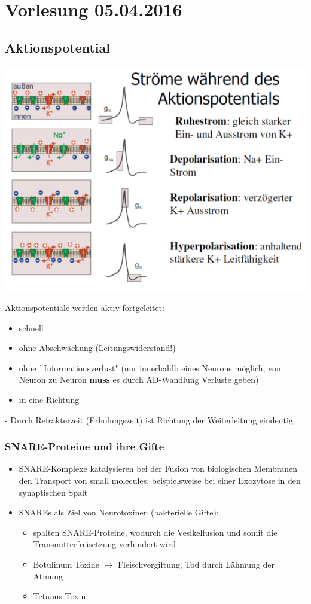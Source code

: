 \section{Vorlesung 05.04.2016}
\subsection{Aktionspotential}
\includegraphics[width=1\textwidth]{lectures/160405/pix/aktionspotential.png}

Aktionspotentiale werden aktiv fortgeleitet:
\begin{itemize}
	\item schnell
	\item ohne Abschwächung (Leitungswiderstand!)
	\item ohne $"$Informationsverlust" (nur innerhahlb eines Neurons möglich, von Neuron zu Neuron \textbf{muss} es durch AD-Wandlung Verluste geben)
	\item in eine Richtung
\end{itemize}

 - Durch Refrakterzeit (Erholungszeit) ist Richtung der Weiterleitung eindeutig

\subsubsection{SNARE-Proteine und ihre Gifte}
\begin{itemize}
	\item SNARE-Komplexe katalysieren bei der Fusion von biologischen Membranen den Transport von small molecules, beispielsweise bei einer Exozytose in den synaptischen Spalt
	\item SNAREs als Ziel von Neurotoxinen (bakterielle Gifte):
		\begin{itemize}
			\item spalten SNARE-Proteine, wodurch die Vesikelfusion und somit die Transmitterfreisetzung verhindert wird
			\item Botulinum Toxine $\rightarrow$ Fleischvergiftung, Tod durch Lähmung der Atmung
			\item Tetanus Toxin
		\end{itemize}
\end{itemize}

